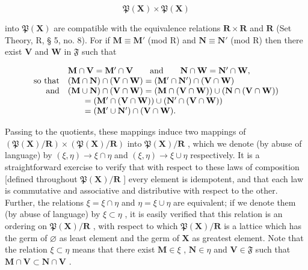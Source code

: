 \[
\mathfrak {P} (\mathbf {X}) \times \mathfrak {P} (\mathbf {X})
\]

into \(\mathfrak{P}(\mathbf{X})\) are compatible with the equivalence relations \(\mathbf{R} \times \mathbf{R}\) and \(\mathbf{R}\) (Set Theory, R, § 5, no. 8). For if \(\mathbf{M} \equiv \mathbf{M}'\) (mod R) and \(\mathbf{N} \equiv \mathbf{N}'\) (mod R) then there exist \(\mathbf{V}\) and \(\mathbf{W}\) in \(\mathfrak{F}\) such that

\[
\begin{array}{r l} & {\mathbf {M} \cap \mathbf {V} = \mathbf {M} ^ {\prime} \cap \mathbf {V} \qquad \mathrm{and} \qquad \mathbf {N} \cap \mathbf {W} = \mathbf {N} ^ {\prime} \cap \mathbf {W},} \\ {\mathrm{so\ that}} & {(\mathbf {M} \cap \mathbf {N}) \cap (\mathbf {V} \cap \mathbf {W}) = (\mathbf {M} ^ {\prime} \cap \mathbf {N} ^ {\prime}) \cap (\mathbf {V} \cap \mathbf {W})} \\ {\mathrm{and}} & {(\mathbf {M} \cup \mathbf {N}) \cap (\mathbf {V} \cap \mathbf {W}) = (\mathbf {M} \cap (\mathbf {V} \cap \mathbf {W})) \cup (\mathbf {N} \cap (\mathbf {V} \cap \mathbf {W}))} \\ & {\qquad = (\mathbf {M} ^ {\prime} \cap (\mathbf {V} \cap \mathbf {W})) \cup (\mathbf {N} ^ {\prime} \cap (\mathbf {V} \cap \mathbf {W}))} \\ & {\qquad = (\mathbf {M} ^ {\prime} \cup \mathbf {N} ^ {\prime}) \cap (\mathbf {V} \cap \mathbf {W}).} \end{array}
\]

Passing to the quotients, these mappings induce two mappings of \((\mathfrak{P}(\mathbf{X}) / \mathbf{R}) \times (\mathfrak{P}(\mathbf{X}) / \mathbf{R})\) into \(\mathfrak{P}(\mathbf{X}) / \mathbf{R}\) , which we denote (by abuse of language) by \((\xi, \eta) \to \xi \cap \eta\) and \((\xi, \eta) \to \xi \cup \eta\) respectively. It is a straightforward exercise to verify that with respect to these laws of composition {[}defined throughout \(\mathfrak{P}(\mathbf{X}) / \mathbf{R}\) {]} every element is idempotent, and that each law is commutative and associative and distributive with respect to the other. Further, the relations \(\xi = \xi \cap \eta\) and \(\eta = \xi \cup \eta\) are equivalent; if we denote them (by abuse of language) by \(\xi \subset \eta\) , it is easily verified that this relation is an ordering on \(\mathfrak{P}(\mathbf{X}) / \mathbf{R}\) , with respect to which \(\mathfrak{P}(\mathbf{X}) / \mathbf{R}\) is a lattice which has the germ of \(\varnothing\) as least element and the germ of \(\mathbf{X}\) as greatest element. Note that the relation \(\xi \subset \eta\) means that there exist \(\mathbf{M} \in \xi\) , \(\mathbf{N} \in \eta\) and \(\mathbf{V} \in \mathfrak{F}\) such that \(\mathbf{M} \cap \mathbf{V} \subset \mathbf{N} \cap \mathbf{V}\) .

